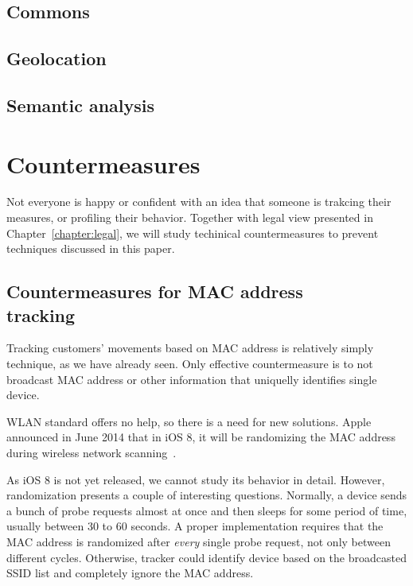 \documentclass[12pt,a4paper,oneside,pdftex]{report}
\begin{document}
\section{Commons}
\label{sec:practical_commons}

\section{Geolocation}
\label{sec:practical_geo}

\section{Semantic analysis}
\label{sec:practical_semantic}





\chapter{Countermeasures}
\label{chapter:countermeasures}

Not everyone is happy or confident with an idea that someone is trakcing their measures, or profiling their behavior. Together with legal view presented in Chapter~\ref{chapter:legal}, we will study techinical countermeasures to prevent techniques discussed in this paper. 

\section{Countermeasures for MAC address\\ tracking}

Tracking customers' movements based on MAC address is relatively simply technique, as we have already seen. Only effective countermeasure is to not broadcast MAC address or other information that uniquelly identifies single device.

WLAN standard offers no help, so there is a need for new solutions. Apple announced in June 2014 that in iOS 8, it will be randomizing the MAC address during wireless network scanning~\cite{FredericJacobs2014,apple_wwdc_privacy}.

As iOS 8 is not yet released, we cannot study its behavior in detail. However, randomization presents a couple of interesting questions. Normally, a device sends a bunch of probe requests almost at once and then sleeps for some period of time, usually between 30 to 60 seconds. A proper implementation requires that the MAC address is randomized after \emph{every} single probe request, not only between different cycles. Otherwise, tracker could identify device based on the broadcasted SSID list and completely ignore the MAC address.
\end{document}
